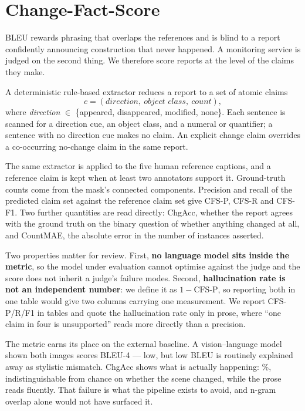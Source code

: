 \section{Change-Fact-Score}
\label{sec:cfs}

BLEU rewards phrasing that overlaps the references and is blind to a report
confidently announcing construction that never happened. A monitoring service
is judged on the second thing. We therefore score reports at the level of the
claims they make.

A deterministic rule-based extractor reduces a report to a set of atomic claims
\[
  c = (\textit{direction},\ \textit{object class},\ \textit{count}),
\]
where \textit{direction} $\in$ \{appeared, disappeared, modified, none\}. Each
sentence is scanned for a direction cue, an object class, and a numeral or
quantifier; a sentence with no direction cue makes no claim. An explicit change
claim overrides a co-occurring no-change claim in the same report.

The same extractor is applied to the five human reference captions, and a
reference claim is kept when at least two annotators support it. Ground-truth
counts come from the mask's connected components. Precision and recall of the
predicted claim set against the reference claim set give CFS-P, CFS-R and
CFS-F1. Two further quantities are read directly: ChgAcc, whether the report
agrees with the ground truth on the binary question of whether anything changed
at all, and CountMAE, the absolute error in the number of instances asserted.

Two properties matter for review. First, \textbf{no language model sits inside
the metric}, so the model under evaluation cannot optimise against the judge
and the score does not inherit a judge's failure modes. Second,
\textbf{hallucination rate is not an independent number}: we define it as
$1 - \text{CFS-P}$, so reporting both in one table would give two columns
carrying one measurement. We report CFS-P/R/F1 in tables and quote the
hallucination rate only in prose, where ``one claim in four is unsupported''
reads more directly than a precision.

The metric earns its place on the external baseline. A vision--language model
shown both images scores BLEU-4 \EFourVLMBleu{} --- low, but low BLEU is
routinely explained away as stylistic mismatch. ChgAcc shows what is actually
happening: \EFourVLMChgAcc\%, indistinguishable from chance on whether the
scene changed, while the prose reads fluently. That failure is what the
pipeline exists to avoid, and n-gram overlap alone would not have surfaced it.
